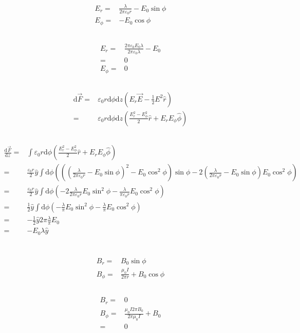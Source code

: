 \documentclass[10pt,fleqn]{article}
\newcommand{\ud}{\mathrm{d}}
\newcommand{\eqar}[1]
{
  \begin{align*}
    #1
  \end{align*}
}
\newcommand{\paren}[1]{{\left({#1}\right)}}
\newcommand{\diff}[3][{}]{{\frac{\ud^{#1} {#2}}{\ud {#3}{}^{#1}}}}
\begin{document}
\subsection{}
\eqar{
  E_r=&\frac{\lambda}{2\pi\varepsilon_0 r}-E_0\sin\phi\\
  E_\phi=&-E_0\cos\phi
}
\subsection{}
\eqar{
  E_r=&\frac{2\pi\varepsilon_0 E_0\lambda}{2\pi\varepsilon_0 \lambda}-E_0\\
  =&0\\
  E_\phi=&0
}
\subsection{}
\eqar{
  \ud\vec F=&\varepsilon_0r\ud\phi\ud z\paren{E_r\vec E-\frac{1}{2}E^2\hat r}\\
  =&\varepsilon_0r\ud\phi\ud z\paren{\frac{E_r^2-E_\phi^2}2\hat r+E_rE_\phi\hat\phi}
}
\subsection{}
\eqar{
  \diff{\vec F}{z}=&\int\varepsilon_0r\ud\phi\paren{\frac{E_r^2-E_\phi^2}2\hat r+E_rE_\phi\hat\phi}\\
  =&\frac{\varepsilon_0r}2\hat y\int\ud\phi\paren{\paren{\paren{\frac{\lambda}{2\pi\varepsilon_0 r}-E_0\sin\phi}^2-E_0\cos^2\phi}\sin\phi-2\paren{\frac{\lambda}{2\pi\varepsilon_0 r}-E_0\sin\phi}E_0\cos^2\phi}\\
  =&\frac{\varepsilon_0r}2\hat y\int\ud\phi\paren{-2\frac{\lambda}{2\pi\varepsilon_0 r}E_0\sin^2\phi-\frac{\lambda}{\pi\varepsilon_0 r}E_0\cos^2\phi}\\
  =&\frac{1}2\hat y\int\ud\phi\paren{-\frac{\lambda}{\pi}E_0\sin^2\phi-\frac{\lambda}{\pi}E_0\cos^2\phi}\\
  =&-\frac{1}2\hat y2\pi\frac{\lambda}{\pi}E_0\\
  =&-E_0\lambda\hat y
}

\section{}
\subsection{}
\eqar{
  B_r=&B_0\sin\phi\\
  B_\phi=&\frac{\mu_0 I}{2\pi r}+B_0\cos\phi
}
\subsection{}
\eqar{
  B_r=&0\\
  B_\phi=&\frac{\mu_0 I2\pi B_0}{2\pi \mu_0I}+B_0\\
  =&0
}
\end{document}
